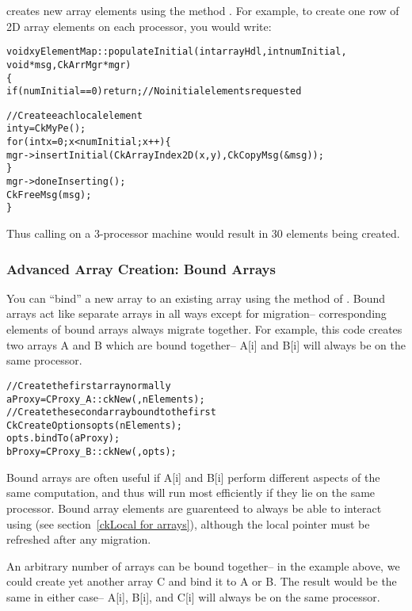  creates new array elements using the method
.
For example, to create one row of 2D array elements on each processor,
you would write:

\begin{alltt}
void xyElementMap::populateInitial(int arrayHdl,int numInitial,
	void *msg,CkArrMgr *mgr)
\{
  if (numInitial==0) return; //No initial elements requested
	
  //Create each local element
  int y=CkMyPe();
  for (int x=0;x<numInitial;x++) \{
    mgr->insertInitial(CkArrayIndex2D(x,y),CkCopyMsg(&msg));
  \}
  mgr->doneInserting();
  CkFreeMsg(msg);
\}
\end{alltt}

Thus calling  on a 3-processor machine would result in
30 elements being created.


\subsubsection{Advanced Array Creation: Bound Arrays}
\experimental{}
 
\label{bound arrays}
You can ``bind'' a new array to an existing array
using the  method of .  Bound arrays
act like separate arrays in all ways except for migration--
corresponding elements of bound arrays always migrate together.
For example, this code creates two arrays A and B which are
bound together-- A[i] and B[i] will always be on the same processor.

\begin{alltt}
//Create the first array normally
  aProxy=CProxy_A::ckNew(,nElements);
//Create the second array bound to the first
  CkCreateOptions opts(nElements);
  opts.bindTo(aProxy);
  bProxy=CProxy_B::ckNew(,opts);
\end{alltt}

Bound arrays are often useful if A[i] and B[i] perform different 
aspects of the same computation, and thus will run most efficiently 
if they lie on the same processor.  Bound array elements are guarenteed
to always be able to interact using  (see 
section~\ref{ckLocal for arrays}), although the local pointer must
be refreshed after any migration.

An arbitrary number of arrays can be bound together--
in the example above, we could create yet another array
C and bind it to A or B.  The result would be the same
in either case-- A[i], B[i], and C[i] will always be
on the same processor.

